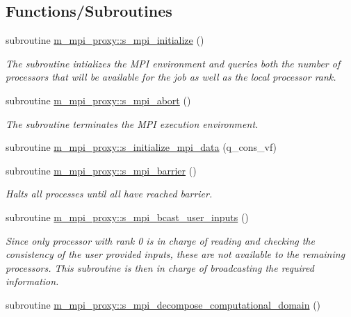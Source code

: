 \subsection*{Functions/\+Subroutines}
\begin{DoxyCompactItemize}
\item 
subroutine \hyperlink{namespacem__mpi__proxy_a9bc4c617505152d3cc553e5bc25c1ee1}{m\+\_\+mpi\+\_\+proxy\+::s\+\_\+mpi\+\_\+initialize} ()
\begin{DoxyCompactList}\small\item\em The subroutine intializes the M\+PI environment and queries both the number of processors that will be available for the job as well as the local processor rank. \end{DoxyCompactList}\item 
subroutine \hyperlink{namespacem__mpi__proxy_a04ac565bad2b22dc045a5eeb4f516e2e}{m\+\_\+mpi\+\_\+proxy\+::s\+\_\+mpi\+\_\+abort} ()
\begin{DoxyCompactList}\small\item\em The subroutine terminates the M\+PI execution environment. \end{DoxyCompactList}\item 
subroutine \hyperlink{namespacem__mpi__proxy_a2ff35ede51e90c483969e44c31303415}{m\+\_\+mpi\+\_\+proxy\+::s\+\_\+initialize\+\_\+mpi\+\_\+data} (q\+\_\+cons\+\_\+vf)
\item 
subroutine \hyperlink{namespacem__mpi__proxy_abfbc42cea69273bc9fa4a2d78f636eb1}{m\+\_\+mpi\+\_\+proxy\+::s\+\_\+mpi\+\_\+barrier} ()
\begin{DoxyCompactList}\small\item\em Halts all processes until all have reached barrier. \end{DoxyCompactList}\item 
subroutine \hyperlink{namespacem__mpi__proxy_a69660c5fe9302a8c0496b622fa3b5286}{m\+\_\+mpi\+\_\+proxy\+::s\+\_\+mpi\+\_\+bcast\+\_\+user\+\_\+inputs} ()
\begin{DoxyCompactList}\small\item\em Since only processor with rank 0 is in charge of reading and checking the consistency of the user provided inputs, these are not available to the remaining processors. This subroutine is then in charge of broadcasting the required information. \end{DoxyCompactList}\item 
subroutine \hyperlink{namespacem__mpi__proxy_a80c5e235786545276fe6ffa06965017f}{m\+\_\+mpi\+\_\+proxy\+::s\+\_\+mpi\+\_\+decompose\+\_\+computational\+\_\+domain} ()

\end{DoxyCompactItemize}
